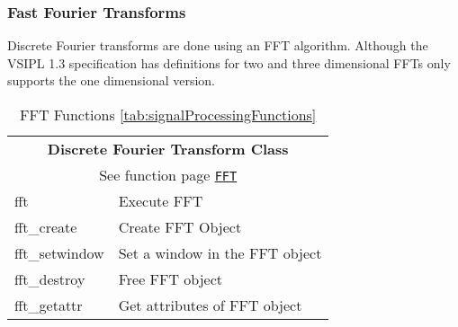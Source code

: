 \subsubsection*{Fast Fourier Transforms} 
Discrete Fourier transforms are done using an FFT algorithm.  Although the VSIPL 1.3 specification has definitions for two and three dimensional FFTs \jv only supports the one dimensional version.
\begin{table}[H]
\caption{FFT Functions \ref{tab:signalProcessingFunctions}}
\label{tab:fftFunctions}
\begin{center}
\begin{tabular}{|l|l|}
\multicolumn{2}{c}{\rmfamily \bfseries Discrete Fourier Transform Class}\\
\multicolumn{2}{c}{See function page \hyperlink{fftFunc}{\texttt{FFT}}} \\ \hline
fft & Execute FFT\\
fft\_create &Create FFT Object\\
fft\_setwindow &Set a window in the FFT object\\
fft\_destroy & Free FFT object\\
fft\_getattr & Get attributes of FFT object\\
\hline\end{tabular}
\end{center}
\label{default}
\end{table}%